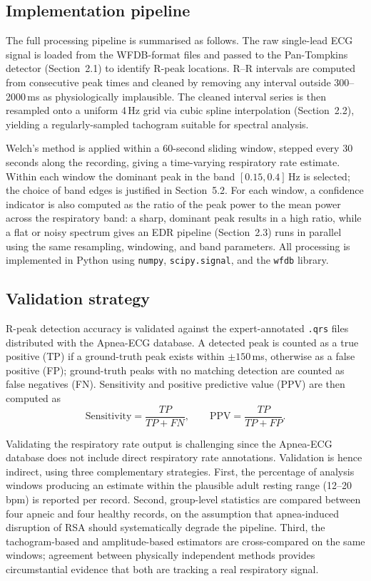 \documentclass[11pt,a4paper]{article}
\begin{document}
\subsection{Implementation pipeline}

The full processing pipeline is summarised as follows. The raw single-lead ECG signal is loaded from the WFDB-format files and passed to the Pan-Tompkins detector (Section~2.1) to identify R-peak locations. R--R intervals are computed from consecutive peak times and cleaned by removing any interval outside 300--2000\,ms as physiologically implausible. The cleaned interval series is then resampled onto a uniform 4\,Hz grid via cubic spline interpolation (Section~2.2), yielding a regularly-sampled tachogram suitable for spectral analysis.

Welch's method is applied within a 60-second sliding window, stepped every 30 seconds along the recording, giving a time-varying respiratory rate estimate. Within each window the dominant peak in the band $[0.15, 0.4]$\,Hz is selected; the choice of band edges is justified in Section~5.2. For each window, a confidence indicator is also computed as the ratio of the peak power to the mean power across the respiratory band: a sharp, dominant peak results in a high ratio, while a flat or noisy spectrum gives an EDR pipeline (Section~2.3) runs in parallel using the same resampling, windowing, and band parameters. All processing is implemented in Python using \texttt{numpy}, \texttt{scipy.signal}, and the \texttt{wfdb} library.

\subsection{Validation strategy}

R-peak detection accuracy is validated against the expert-annotated \texttt{.qrs} files distributed with the Apnea-ECG database. A detected peak is counted as a true positive (TP) if a ground-truth peak exists within $\pm 150$\,ms, otherwise as a false positive (FP); ground-truth peaks with no matching detection are counted as false negatives (FN). Sensitivity and positive predictive value (PPV) are then computed as
\begin{equation}
    \mathrm{Sensitivity} = \frac{TP}{TP + FN}, \qquad \mathrm{PPV} = \frac{TP}{TP + FP}.
\end{equation}

Validating the respiratory rate output is challenging since the Apnea-ECG database does not include direct respiratory rate annotations. Validation is hence indirect, using three complementary strategies. First, the percentage of analysis windows producing an estimate within the plausible adult resting range (12--20\,bpm) is reported per record. Second, group-level statistics are compared between four apneic and four healthy records, on the assumption that apnea-induced disruption of RSA should systematically degrade the pipeline. Third, the tachogram-based and amplitude-based estimators are cross-compared on the same windows; agreement between physically independent methods provides circumstantial evidence that both are tracking a real respiratory signal.
\end{document}
